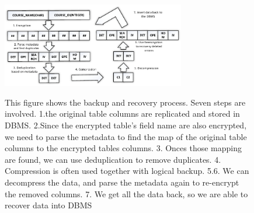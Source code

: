 
\begin{figure}[tb]
\centering
\includegraphics[width=8cm]{images/backup_and_recovery.pdf}
\label{fig:stack7}
\caption{\small{This figure shows the backup and recovery process. Seven steps are involved. 1.the original table columns are replicated and stored in DBMS. 2.Since the encrypted table's field name are also encrypted, we need to parse the metadata to find the map of the original table columns to the encrypted tables columns. 3. Onces those mapping are found, we can use deduplication to remove duplicates. 4. Compression is often used together with logical backup. 5.6. We can decompress the data, and parse the metadata again to re-encrypt the removed columns. 7. We get all the data back, so we are able to recover data into DBMS}}
\end{figure}



